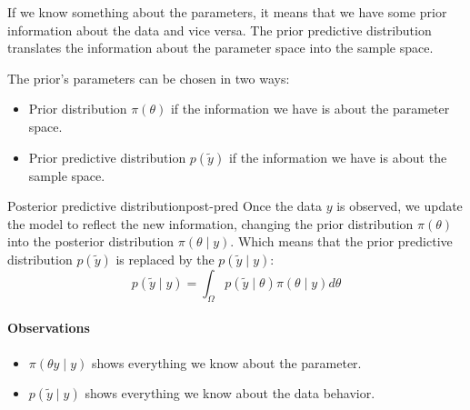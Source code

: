 If we know something about the parameters, it means that we have some prior information about the data
and vice versa. The prior predictive distribution translates the information about the
parameter space into the sample space.

The prior's parameters can be chosen in two ways:
\begin{itemize}
	\item Prior distribution $\pi(\theta)$ if the information we have is about the parameter space.
	\item Prior predictive distribution $p(\tilde y)$ if the information we have is about the sample space.
\end{itemize}

\begin{definition}{Posterior predictive distribution}{post-pred}
	Once the data $y$ is observed, we update the model to reflect the new information,
	changing the prior distribution $\pi(\theta)$ into the posterior distribution $\pi(\theta \mid y)$.
	Which means that the prior predictive distribution $p(\tilde y)$ is replaced by the
	 $p(\tilde y \mid y)$:
	\begin{equation}
		p(\tilde y \mid y) = \int_{\Omega} p(\tilde y \mid \theta) \pi(\theta \mid y) d\theta
	\end{equation}

	\paragraph{Observations}
	\begin{itemize}
		\item $\pi(\theta y \mid y)$ shows everything we know about the parameter.
		\item $p(\tilde y \mid y)$ shows everything we know about the data behavior.
	\end{itemize}
\end{definition}

